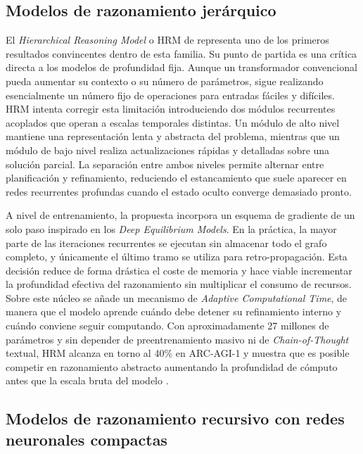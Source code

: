 \documentclass[11pt,a4paper,spanish]{book}
\numberwithin{equation}{chapter}
\numberwithin{figure}{chapter}
\begin{document}
\subsection{Modelos de razonamiento jerárquico}

El \textit{Hierarchical Reasoning Model} o HRM de  representa uno de los primeros 
resultados convincentes dentro de esta familia. Su punto de partida es una crítica directa a los modelos de 
profundidad fija. Aunque un transformador convencional pueda aumentar su contexto o su número de parámetros, 
sigue realizando esencialmente un número fijo de operaciones para entradas fáciles y difíciles. HRM intenta 
corregir esta limitación introduciendo dos módulos recurrentes acoplados que operan a escalas temporales distintas. 
Un módulo de alto nivel mantiene una representación lenta y abstracta del problema, mientras que un módulo de bajo 
nivel realiza actualizaciones rápidas y detalladas sobre una solución parcial. La separación entre ambos niveles 
permite alternar entre planificación y refinamiento, reduciendo el estancamiento que suele aparecer en redes 
recurrentes profundas cuando el estado oculto converge demasiado pronto.

A nivel de entrenamiento, la propuesta incorpora un esquema de gradiente de un solo paso inspirado en los 
\textit{Deep Equilibrium Models}. En la práctica, la mayor parte de las iteraciones recurrentes se ejecutan sin 
almacenar todo el grafo completo, y únicamente el último tramo se utiliza para retro-propagación. Esta decisión reduce 
de forma drástica el coste de memoria y hace viable incrementar la profundidad efectiva del razonamiento sin multiplicar 
el consumo de recursos. Sobre este núcleo se añade un mecanismo de \textit{Adaptive Computational Time}, de manera que el 
modelo aprende cuándo debe detener su refinamiento interno y cuándo conviene seguir computando. Con aproximadamente 27 millones de parámetros y sin 
depender de preentrenamiento masivo ni de \textit{Chain-of-Thought} textual, HRM alcanza en torno al 40\% en ARC-AGI-1 y 
muestra que es posible competir en razonamiento abstracto aumentando la profundidad de cómputo antes que la escala bruta del 
modelo \cite{wang2025hierarchical}.

\subsection{Modelos de razonamiento recursivo con redes neuronales compactas}
\end{document}
